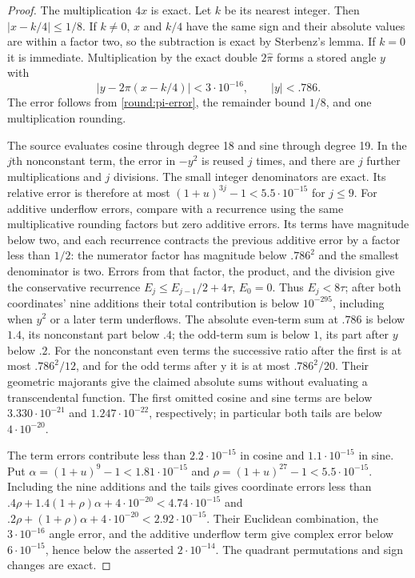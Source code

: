 \begin{proof}
The multiplication $4x$ is exact.  Let $k$ be its nearest integer.
Then $|x-k/4|\le1/8$.  If $k\ne0$, $x$ and $k/4$ have the same sign
and their absolute values are within a factor two, so the subtraction
is exact by Sterbenz's lemma.  If $k=0$ it is immediate.  Multiplication
by the exact double $2\widehat\pi$ forms a stored angle $y$ with
\[
 |y-2\pi(x-k/4)|<3\cdot10^{-16},\qquad |y|<.786.
\]
The error follows from \eqref{round:pi-error}, the remainder bound $1/8$,
and one multiplication rounding.

The source evaluates cosine through degree 18 and sine through degree
19.  In the $j$th nonconstant term, the error in $-y^2$ is reused $j$
times, and there are $j$ further multiplications and $j$ divisions.
The small integer denominators are exact.  Its relative error is
therefore at most $(1+u)^{3j}-1<5.5\cdot10^{-15}$ for $j\le9$.
For additive underflow errors, compare with a recurrence using the
same multiplicative rounding factors but zero additive errors.
Its terms have magnitude below two, and each recurrence contracts
the previous additive error by a factor less than $1/2$:
the numerator factor has magnitude below $.786^2$ and the smallest
denominator is two.  Errors from that factor, the product, and the
division give the conservative recurrence
$E_j\le E_{j-1}/2+4\tau$, $E_0=0$.
Thus $E_j<8\tau$; after both coordinates' nine additions their
total contribution is below $10^{-295}$, including when $y^2$
or a later term underflows.
The absolute even-term sum at $.786$ is below $1.4$, its nonconstant
part below $.4$; the odd-term sum is below $1$, its part after $y$
below $.2$.  For the nonconstant even terms the successive ratio
after the first is at most $.786^2/12$, and for the odd terms after y
it is at most $.786^2/20$.  Their geometric majorants give the claimed
absolute sums without evaluating a transcendental function.
The first omitted cosine and sine terms
are below $3.330\cdot10^{-21}$ and $1.247\cdot10^{-22}$, respectively;
in particular both tails are below $4\cdot10^{-20}$.

The term errors contribute less than $2.2\cdot10^{-15}$ in cosine and
$1.1\cdot10^{-15}$ in sine.  Put
$\alpha=(1+u)^9-1<1.81\cdot10^{-15}$ and
$\rho=(1+u)^{27}-1<5.5\cdot10^{-15}$.
Including the nine additions and the tails gives coordinate errors
less than
$.4\rho+1.4(1+\rho)\alpha+4\cdot10^{-20}<4.74\cdot10^{-15}$
and
$.2\rho+(1+\rho)\alpha+4\cdot10^{-20}<2.92\cdot10^{-15}$.
Their Euclidean combination, the $3\cdot10^{-16}$ angle error,
and the additive underflow term give complex error below
$6\cdot10^{-15}$, hence below the asserted
$2\cdot10^{-14}$.  The quadrant permutations and sign changes are exact.


\end{proof}
